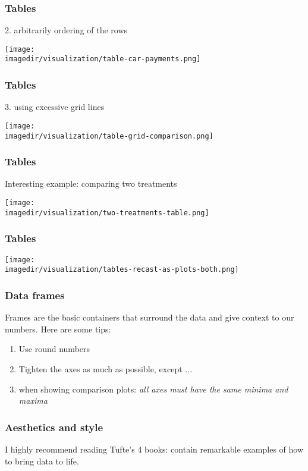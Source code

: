 \begin{frame}\frametitle{Tables}
	2. arbitrarily ordering of the rows 
	\begin{center}
		\texttt{[image: \\imagedir/visualization/table-car-payments.png]}
	\end{center}
\end{frame}

\begin{frame}\frametitle{Tables}
	3. using excessive grid lines 
	\begin{center}
		\texttt{[image: \\imagedir/visualization/table-grid-comparison.png]}
	\end{center}
\end{frame}

\begin{frame}\frametitle{Tables}
	Interesting example: comparing two treatments
	\begin{center}
		\texttt{[image: \\imagedir/visualization/two-treatments-table.png]}
	\end{center}
\end{frame}

\begin{frame}\frametitle{Tables}
	\begin{center}
		\texttt{[image: \\imagedir/visualization/tables-recast-as-plots-both.png]}
	\end{center}	
\end{frame}

\begin{frame}[allowframebreaks]\frametitle{Data frames}
	
	Frames are the basic containers that surround the data and give context to our numbers. Here are some tips:
	\begin{enumerate}
		\item	Use round numbers 
		\item	Tighten the axes as much as possible, except ... 
		\item	when showing comparison plots: \emph{all axes must have the same minima and maxima} 
	\end{enumerate}
\end{frame}

\begin{frame}[allowframebreaks]\frametitle{Aesthetics and style}
	
	I highly recommend reading Tufte's 4 books: contain remarkable examples of how to bring data to life.
\end{frame}

